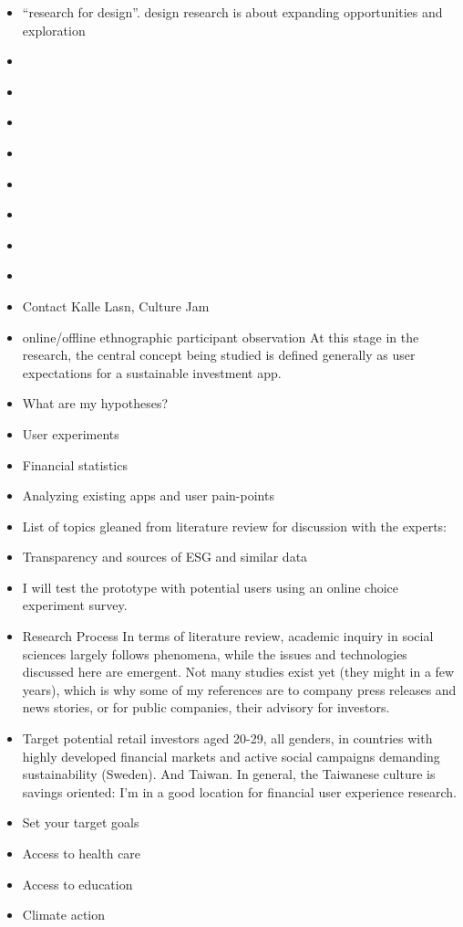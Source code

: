 \documentclass[
  letterpaper,
  DIV=11,
  numbers=noendperiod]{scrartcl}
\begin{document}
\begin{itemize}
\item
  ``research for design''. design research is about expanding
  opportunities and exploration
\item
  \citet{ranywayzResearchDesign2016}
\item
  \citet{mehmetaydinbaytasKindsDesignResearch2020}
\item
  \citet{047WordCreative}
\item
  \citet{KindsDesignResearch}
\item
  \citet{QualitativeVsQuantitative}
\item
  \citet{WhenUseWhich}
\item
  \citet{GreatUXResearch}
\item
  \citet{erikahallDesignResearchDone}
\item
  Contact Kalle Lasn, Culture Jam
\item
  online/offline ethnographic participant observation At this stage in
  the research, the central concept being studied is defined generally
  as user expectations for a sustainable investment app.
\item
  What are my hypotheses?
\item
  User experiments
\item
  Financial statistics
\item
  Analyzing existing apps and user pain-points
\item
  List of topics gleaned from literature review for discussion with the
  experts:
\item
  Transparency and sources of ESG and similar data
\item
  I will test the prototype with potential users using an online choice
  experiment survey.
\item
  Research Process In terms of literature review, academic inquiry in
  social sciences largely follows phenomena, while the issues and
  technologies discussed here are emergent. Not many studies exist yet
  (they might in a few years), which is why some of my references are to
  company press releases and news stories, or for public companies,
  their advisory for investors.
\item
  Target potential retail investors aged 20-29, all genders, in
  countries with highly developed financial markets and active social
  campaigns demanding sustainability (Sweden). And Taiwan. In general,
  the Taiwanese culture is savings oriented: I'm in a good location for
  financial user experience research.
\item
  Set your target goals
\item
  Access to health care
\item
  Access to education
\item
  Climate action
\end{itemize}
\end{document}
